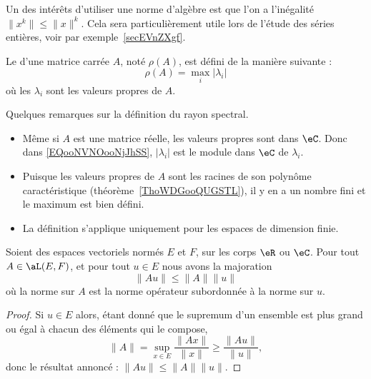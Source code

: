 Un des intérêts d'utiliser une norme d'algèbre est que l'on a l'inégalité \( \| x^k \|\leq \| x \|^k \). Cela sera particulièrement utile lors de l'étude des séries entières, voir par exemple~\ref{secEVnZXgf}.

\begin{definition}      \label{DEFooEAUKooSsjqaL}
	Le  d'une matrice carrée \( A\), noté \( \rho(A)\), est défini de la manière suivante :
	\begin{equation}    \label{EQooNVNOooNjJhSS}
		\rho(A)=\max_i|\lambda_i|
	\end{equation}
	où les \( \lambda_i\) sont les valeurs propres de \( A\).
\end{definition}

\begin{normaltext}
	Quelques remarques sur la définition du rayon spectral.
	\begin{itemize}
		\item
		      Même si \( A\) est une matrice réelle, les valeurs propres sont dans \( \eC\). Donc dans \eqref{EQooNVNOooNjJhSS}, \( | \lambda_i |\) est le module dans \( \eC\) de \( \lambda_i\).
		\item
		      Puisque les valeurs propres de \( A\) sont les racines de son polynôme caractéristique (théorème~\ref{ThoWDGooQUGSTL}), il y en a un nombre fini et le maximum est bien défini.
		\item
		      La définition s'applique uniquement pour les espaces de dimension finie.
	\end{itemize}
\end{normaltext}

\begin{lemma}       \label{LEMooIBLEooLJczmu}
	Soient des espaces vectoriels normés \( E\) et \( F\), sur les corps \( \eR\) ou \( \eC\). Pour tout \( A\in \aL(E,F)\), et pour tout \( u\in E\) nous avons la majoration
	\begin{equation}
		\| Au \|\leq \| A \|\| u \|
	\end{equation}
	où la norme sur \( A\) est la norme opérateur subordonnée à la norme sur \( u\).
\end{lemma}

\begin{proof}
	Si \( u\in E\) alors, étant donné que le supremum d'un ensemble est plus grand ou égal à chacun des éléments qui le compose,
	\begin{equation}
		\| A \|=\sup_{x\in E}\frac{ \| Ax \| }{ \| x \| }\geq \frac{ \| Au \| }{ \| u \| },
	\end{equation}
	donc le résultat annoncé : \( \| Au \|\leq \| A \|\| u \|\).
\end{proof}


